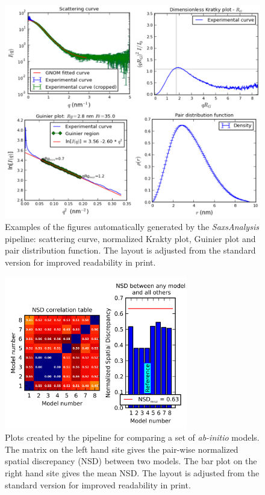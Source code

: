 \documentclass[preprint,pdf]{iucr}              %
\begin{document}
\begin{figure}
\centering
\includegraphics[width=18cm]{autoplot.png}
\caption{Examples of the figures automatically generated by the
\textit{SaxsAnalysis} pipeline: scattering curve, normalized Krakty plot, Guinier plot and pair distribution function.
The layout is adjusted from the standard version for improved readability in
print.}
\label{plots}
\end{figure}

\begin{figure}
\centering
\includegraphics[width=8cm]{nsd.png}
\caption{Plots created by the pipeline for comparing a set of \textit{ab-initio} models.
The matrix on the left hand site gives the pair-wise normalized spatial discrepancy (NSD) between two models.
The bar plot on the right hand site gives the mean NSD.
The layout is adjusted from the standard version for improved readability in
print.}
\label{fgr:nsd}
\end{figure}
\end{document}
